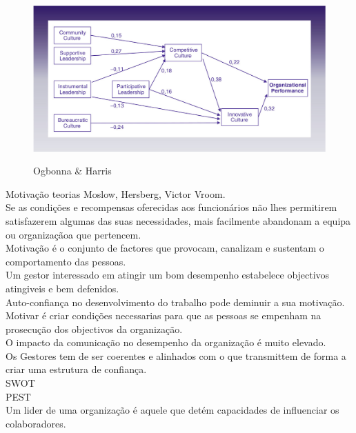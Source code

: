 \begin{figure}[H]
\centering
\includegraphics[scale=.3]{"./image/OB/Ogbonna & Harris.jpg"}\\
\caption{Ogbonna \& Harris}
\label{grafico 1}
\end{figure}\par



Motivação teorias Moslow, Hersberg, Victor Vroom.\\
Se as condições e recompensas oferecidas aos funcionários não lhes permitirem satisfazerem algumas das suas necessidades, mais facilmente abandonam a equipa ou organizaçãoa que pertencem.\\
Motivação é o conjunto de factores que provocam, canalizam e sustentam o comportamento das pessoas.\\

Um gestor interessado em atingir um bom desempenho estabelece objectivos atingiveis e bem defenidos.\\
Auto-confiança no desenvolvimento do trabalho pode deminuir a sua motivação.\\
Motivar é criar condições necessarias para que as pessoas se empenham na prosecução dos objectivos da organização.\\

O impacto da comunicação no desempenho da organização é muito elevado.\\
Os Gestores tem de ser coerentes e alinhados com o que transmittem de forma a criar uma estrutura de confiança.\\

SWOT\\
PEST\\

Um lider de uma organização é aquele que detém capacidades de influenciar os colaboradores.\\

